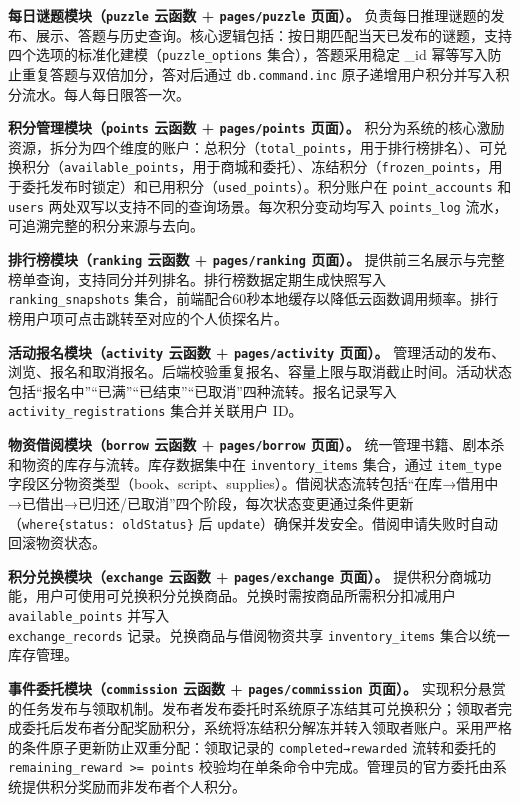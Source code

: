 \documentclass[a4paper,12pt]{article}
\begin{document}
\textbf{每日谜题模块（\texttt{puzzle} 云函数 + \texttt{pages/puzzle} 页面）。} 负责每日推理谜题的发布、展示、答题与历史查询。核心逻辑包括：按日期匹配当天已发布的谜题，支持四个选项的标准化建模（\texttt{puzzle\_options} 集合），答题采用稳定 \_id 幂等写入防止重复答题与双倍加分，答对后通过 \texttt{db.command.inc} 原子递增用户积分并写入积分流水。每人每日限答一次。

\textbf{积分管理模块（\texttt{points} 云函数 + \texttt{pages/points} 页面）。} 积分为系统的核心激励资源，拆分为四个维度的账户：总积分（\texttt{total\_points}，用于排行榜排名）、可兑换积分（\texttt{available\_points}，用于商城和委托）、冻结积分（\texttt{frozen\_points}，用于委托发布时锁定）和已用积分（\texttt{used\_points}）。积分账户在 \texttt{point\_accounts} 和 \texttt{users} 两处双写以支持不同的查询场景。每次积分变动均写入 \texttt{points\_log} 流水，可追溯完整的积分来源与去向。

\textbf{排行榜模块（\texttt{ranking} 云函数 + \texttt{pages/ranking} 页面）。} 提供前三名展示与完整榜单查询，支持同分并列排名。排行榜数据定期生成快照写入 \texttt{ranking\_snapshots} 集合，前端配合60秒本地缓存以降低云函数调用频率。排行榜用户项可点击跳转至对应的个人侦探名片。

\textbf{活动报名模块（\texttt{activity} 云函数 + \texttt{pages/activity} 页面）。} 管理活动的发布、浏览、报名和取消报名。后端校验重复报名、容量上限与取消截止时间。活动状态包括“报名中”“已满”“已结束”“已取消”四种流转。报名记录写入 \texttt{activity\_registrations} 集合并关联用户 ID。

\textbf{物资借阅模块（\texttt{borrow} 云函数 + \texttt{pages/borrow} 页面）。} 统一管理书籍、剧本杀和物资的库存与流转。库存数据集中在 \texttt{inventory\_items} 集合，通过 \texttt{item\_type} 字段区分物资类型（book、script、supplies）。借阅状态流转包括“在库→借用中→已借出→已归还/已取消”四个阶段，每次状态变更通过条件更新（\texttt{where\{status:\allowbreak\ oldStatus\}} 后 \texttt{update}）确保并发安全。借阅申请失败时自动回滚物资状态。

\textbf{积分兑换模块（\texttt{exchange} 云函数 + \texttt{pages/exchange} 页面）。} 提供积分商城功能，用户可使用可兑换积分兑换商品。兑换时需按商品所需积分扣减用户 \texttt{available\_points} 并写入\\
\texttt{exchange\_records} 记录。兑换商品与借阅物资共享 \texttt{inventory\_items} 集合以统一库存管理。

\textbf{事件委托模块（\texttt{commission} 云函数 + \texttt{pages/commission} 页面）。} 实现积分悬赏的任务发布与领取机制。发布者发布委托时系统原子冻结其可兑换积分；领取者完成委托后发布者分配奖励积分，系统将冻结积分解冻并转入领取者账户。采用严格的条件原子更新防止双重分配：领取记录的 \texttt{completed→rewarded} 流转和委托的 \texttt{remaining\_reward\allowbreak\ >= points} 校验均在单条命令中完成。管理员的官方委托由系统提供积分奖励而非发布者个人积分。
\end{document}
